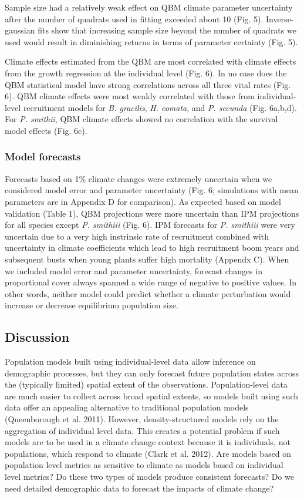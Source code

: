 \documentclass[12pt,]{article}
\begin{document}
Sample size had a relatively weak effect on QBM climate parameter
uncertainty after the number of quadrats used in fitting exceeded about
10 (Fig. 5). Inverse-gaussian fits show that increasing sample size
beyond the number of quadrats we used would result in diminishing
returns in terms of parameter certainty (Fig. 5).

Climate effects estimated from the QBM are most correlated with climate
effects from the growth regression at the individual level (Fig. 6). In
no case does the QBM statistical model have strong correlations across
all three vital rates (Fig. 6). QBM climate effects were most weakly
correlated with those from individual-level recruitment models for
\emph{B. gracilis}, \emph{H. comata}, and \emph{P. secunda} (Fig.
6a,b,d). For \emph{P. smithii}, QBM climate effects showed no
correlation with the survival model effects (Fig. 6c).

\subsubsection{Model forecasts}\label{model-forecasts}

Forecasts based on 1\% climate changes were extremely uncertain when we
considered model error and parameter uncertainty (Fig. 6; simulations
with mean parameters are in Appendix D for comparison). As expected
based on model validation (Table 1), QBM projections were more uncertain
than IPM projections for all species except \emph{P. smithiii} (Fig. 6).
IPM forecasts for \emph{P. smithiii} were very uncertain due to a very
high instrinsic rate of recruitment combined with uncertainty in climate
coefficients which lead to high recruitment boom years and subsequent
busts when young plants suffer high mortality (Appendx C). When we
included model error and parameter uncertainty, forecast changes in
proportional cover always spanned a wide range of negative to positive
values. In other words, neither model could predict whether a climate
perturbation would increase or decrease equilibrium population size.

\subsection{Discussion}\label{discussion}

Population models built using individual-level data allow inference on
demographic processes, but they can only forecast future population
states across the (typically limited) spatial extent of the
observations. Population-level data are much easier to collect across
broad spatial extents, so models built using such data offer an
appealing alternative to traditional population models (Queenborough et
al. 2011). However, density-structured models rely on the aggregation of
individual level data. This creates a potential problem if such models
are to be used in a climate change context because it is individuals,
not populations, which respond to climate (Clark et al. 2012). Are
models based on population level metrics as sensitive to climate as
models based on individual level metrics? Do these two types of models
produce consistent forecasts? Do we need detailed demographic data to
forecast the impacts of climate change?
\end{document}

